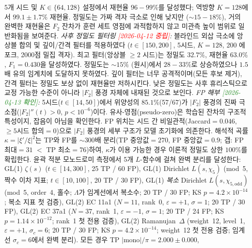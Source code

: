 \documentclass[11pt, a4paper]{article}
\theoremstyle{definition}
\theoremstyle{plain}
\newcommand{\xif}{\xi}
\begin{document}
\begin{itemize}
        5개 시드 및 $K\in\{64,128\}$ 설정에서 재현율
        $96{-}99\%$를 달성했다; 역방향 $K=128$에서
        $99.1\pm1.7\%$ 재현율. 정밀도는 가짜 격자 극소로 인해
        낮지만 ($\sim\!15{-}18\%$), 거의 완벽한 재현율은 $F_2$
        잔차가 훈련 세트 영점에 과적합하지 않고 미관측 높이
        범위로 일반화됨을 보여준다.
        \emph{사후 정밀도 필터링
        \textcolor{red}{[2026-04-12 중립]}:}
        블라인드 외삽 극소에 앙상블 합의 및 깊이/간격 필터를 적용하였다
        ($t\in[150,200]$, 5시드, $K=128$, 200 에포크, 2000점 밀집 격자).
        최고 필터(앙상블 $\ge 2$ 시드)는 정밀도 $32.7\%$,
        재현율 $63.0\%$, $F_1=0.430$을 달성하였다.
        정밀도는 ${\sim}15\%$ (원시)에서 $28{-}33\%$로 상승하였으나
        $1.5$배 유의 임계치에 도달하지 못하였다.
        깊이 필터는 너무 공격적이며(모든 후보 제거), 간격 필터는
        정밀도 보상 없이 재현율만 저하시킨다.
        낮은 정밀도는 사후 휴리스틱으로 교정 가능한 수준이 아니라
        $|F_2|$ 풍경 자체에 내재된 것으로 보인다.
        \emph{FP 해부
        \textcolor{ForestGreen}{[2026-04-13 확인]}:}
        5시드($t\in[14,50]$)에서 위양성의 $85.1\%$(57/67)가
        $|F_2|$ 풍경의 진짜 극소점($|F_2|''(t)>0$, $p<10^{-6}$)이다.
        유사-영점(pseudo-zero)은 학습된 잔차의 구조적 특성이지,
        잡음이 아님을 확인한다.
        FP 위치는 시드 간 비일관적(Jaccard${}=0.046$,
        $\ge\!5$시드 합의${}=0$)으로 $|F_2|$ 풍경의 세부 구조가
        모델 초기화에 의존한다.
        해석적 곡률 $\kappa=|\xif'/\xif|^2$는 TP와 FP를
        ${\sim}300$배 분리(TP 중앙값${}=270$, FP 중앙값${}=0.9$;
        갭: FP 최대${}=31$ $<$ TP 최소${}=76$)하여,
        $\kappa$가 이용 가능한 경우 이론적 정밀도 상한 $100\%$를
        확립한다. 윤곽 적분 모노드로미 측정에서 5개 $L$-함수에 걸쳐 완벽 분리를 달성한다:
        GL(1) $\zeta(s)$ ($t\in[14,300]$, 25 TP / 60 FP),
        GL(1) Dirichlet $L(s,\chi_5)$ (mod~5, 짝수 이차 지표;
        $t\in[10,100]$, 20 TP / 30 FP),
        GL(1) \emph{복소} Dirichlet $L(s,\chi_{5,\mathrm{odd}})$ (mod~5, order~4, 홀수;
        $\Lambda$가 임계선에서 복소수;
        20 TP / 30 FP; KS $p = 4.2 \times 10^{-14}$; 복소 지표 첫 검증),
        GL(2) EC 11a1 ($N=11$, rank~0, $\varepsilon=+1$, $\sigma=1$;
        20 TP / 30 FP),
        GL(2) EC 37a1 ($N=37$, rank~1, $\varepsilon=-1$, $\sigma=1$;
        20 TP / 24 FP; KS $p = 1.14 \times 10^{-12}$; rank~1 첫 전용 검증),
        GL(2) Ramanujan~$\Delta$ (weight~12, level~1, $\varepsilon=+1$, $\sigma_c=6$;
        20 TP / 30 FP; KS $p = 4.2 \times 10^{-14}$; weight~12 첫 전용 검증;
        임계선 $\sigma_c=6$에서 완벽 분리).
        모든 경우 TP $|\mathrm{mono}|/\pi = 2.000 \pm 0.000$,

\end{itemize}
\end{document}
